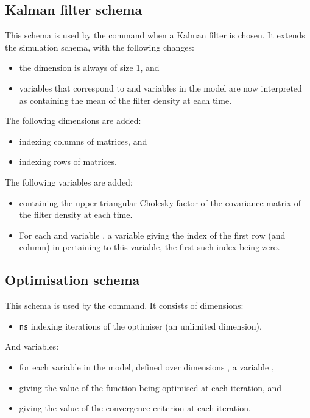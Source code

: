 \subsection{Kalman filter schema}

This schema is used by the  command when a Kalman filter is
chosen. It extends the simulation schema, with the following changes:
\begin{itemize}
\item the  dimension is always of size 1, and
\item variables that correspond to  and  variables
  in the model are now interpreted as containing the mean of the filter
  density at each time.
\end{itemize}

The following dimensions are added:
\begin{itemize}
\item {} indexing columns of matrices, and
\item {} indexing rows of matrices.
\end{itemize}

The following variables are added:
\begin{itemize}
\item {} containing the upper-triangular Cholesky
  factor of the covariance matrix of the filter density at each time.
\item For each  and  variable , a
  variable  giving the index of the first row (and
  column) in  pertaining to this variable, the first such index being
  zero.
\end{itemize}

\subsection{Optimisation schema}

This schema is used by the  command. It consists of
dimensions:
\begin{itemize}
\item \texttt{ns} indexing iterations of the optimiser (an unlimited
  dimension).
\end{itemize}
And variables:
\begin{itemize}
\item for each  variable  in the model,
  defined over dimensions , a variable
  ,
\item {} giving the value of the function being
  optimised at each iteration, and
\item {} giving the value of the convergence criterion
  at each iteration.
\end{itemize}

